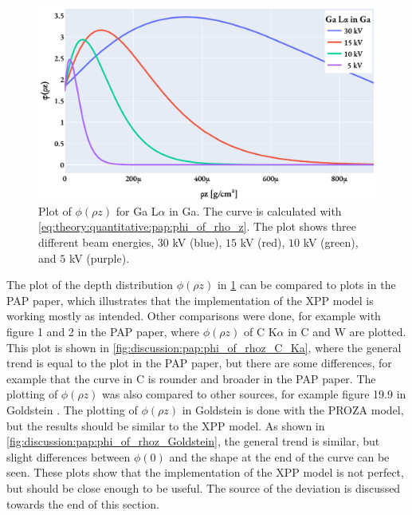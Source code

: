 \begin{figure}[htbp]
    \centering
    \includegraphics[width=0.8\linewidth]{figures/discussion/PAP_phi_of_rhoz.pdf}
    \caption{
        Plot of $\phi(\rho z)$ for Ga L$\alpha$ in Ga.
        The curve is calculated with \cref{eq:theory:quantitative:pap:phi_of_rho_z}.
        The plot shows three different beam energies, $30$ kV (blue), $15$ kV (red), $10$ kV (green), and $5$ kV (purple).
    }
    \label{fig:discussion:pap:phi_of_rhoz}
\end{figure}


The plot of the depth distribution $\phi(\rho z)$ in \cref{fig:discussion:pap:phi_of_rhoz} can be compared to plots in the PAP paper\cite{pap_1991}, which illustrates that the implementation of the XPP model is working mostly as intended.
Other comparisons were done, for example with figure 1 and 2 in the PAP paper, where $\phi(\rho z)$ of C K$\alpha$ in C and W are plotted.
This plot is shown in \cref{fig:discussion:pap:phi_of_rhoz_C_Ka}, where the general trend is equal to the plot in the PAP paper, but there are some differences, for example that the curve in C is rounder and broader in the PAP paper.
The plotting of $\phi(\rho z)$ was also compared to other sources, for example figure 19.9 in Goldstein \cite[Fig. 19.9]{goldstein_scanning_2018}.
The plotting of $\phi(\rho z)$ in Goldstein is done with the PROZA model, but the results should be similar to the XPP model.
As shown in \cref{fig:discussion:pap:phi_of_rhoz_Goldstein}, the general trend is similar, but slight differences between $\phi(0)$ and the shape at the end of the curve can be seen.
These plots show that the implementation of the XPP model is not perfect, but should be close enough to be useful.
The source of the deviation is discussed towards the end of this section.


